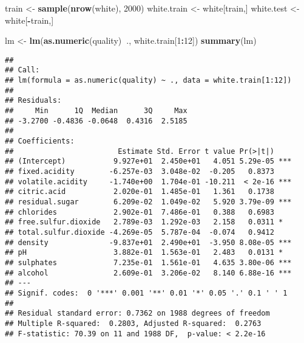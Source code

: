 \documentclass[]{article}
\newenvironment{Shaded}{\begin{snugshade}}{\end{snugshade}}
\newcommand{\KeywordTok}[1]{\textcolor[rgb]{0.13,0.29,0.53}{\textbf{#1}}}
\newcommand{\DecValTok}[1]{\textcolor[rgb]{0.00,0.00,0.81}{#1}}
\newcommand{\StringTok}[1]{\textcolor[rgb]{0.31,0.60,0.02}{#1}}
\newcommand{\OperatorTok}[1]{\textcolor[rgb]{0.81,0.36,0.00}{\textbf{#1}}}
\newcommand{\NormalTok}[1]{#1}
\begin{document}
\begin{Shaded}
\begin{Highlighting}[]
\NormalTok{train <-}\StringTok{ }\KeywordTok{sample}\NormalTok{(}\KeywordTok{nrow}\NormalTok{(white), }\DecValTok{2000}\NormalTok{)}
\NormalTok{white.train <-}\StringTok{ }\NormalTok{white[train,]}
\NormalTok{white.test <-}\StringTok{ }\NormalTok{white[}\OperatorTok{-}\NormalTok{train,]}
\end{Highlighting}
\end{Shaded}

\begin{Shaded}
\begin{Highlighting}[]
\NormalTok{lm <-}\StringTok{ }\KeywordTok{lm}\NormalTok{(}\KeywordTok{as.numeric}\NormalTok{(quality)}\OperatorTok{~}\NormalTok{., white.train[}\DecValTok{1}\OperatorTok{:}\DecValTok{12}\NormalTok{])}
\KeywordTok{summary}\NormalTok{(lm)}
\end{Highlighting}
\end{Shaded}

\begin{verbatim}
## 
## Call:
## lm(formula = as.numeric(quality) ~ ., data = white.train[1:12])
## 
## Residuals:
##     Min      1Q  Median      3Q     Max 
## -3.2700 -0.4836 -0.0648  0.4316  2.5185 
## 
## Coefficients:
##                        Estimate Std. Error t value Pr(>|t|)    
## (Intercept)           9.927e+01  2.450e+01   4.051 5.29e-05 ***
## fixed.acidity        -6.257e-03  3.048e-02  -0.205   0.8373    
## volatile.acidity     -1.740e+00  1.704e-01 -10.211  < 2e-16 ***
## citric.acid           2.020e-01  1.485e-01   1.361   0.1738    
## residual.sugar        6.209e-02  1.049e-02   5.920 3.79e-09 ***
## chlorides             2.902e-01  7.486e-01   0.388   0.6983    
## free.sulfur.dioxide   2.789e-03  1.292e-03   2.158   0.0311 *  
## total.sulfur.dioxide -4.269e-05  5.787e-04  -0.074   0.9412    
## density              -9.837e+01  2.490e+01  -3.950 8.08e-05 ***
## pH                    3.882e-01  1.563e-01   2.483   0.0131 *  
## sulphates             7.235e-01  1.561e-01   4.635 3.80e-06 ***
## alcohol               2.609e-01  3.206e-02   8.140 6.88e-16 ***
## ---
## Signif. codes:  0 '***' 0.001 '**' 0.01 '*' 0.05 '.' 0.1 ' ' 1
## 
## Residual standard error: 0.7362 on 1988 degrees of freedom
## Multiple R-squared:  0.2803, Adjusted R-squared:  0.2763 
## F-statistic: 70.39 on 11 and 1988 DF,  p-value: < 2.2e-16
\end{verbatim}

\begin{Shaded}
\end{Shaded}
\end{document}

